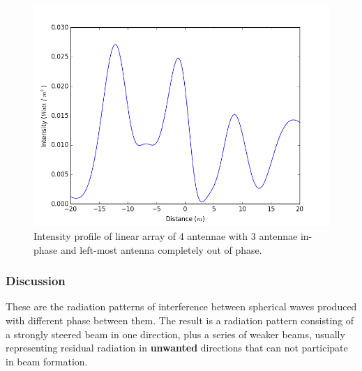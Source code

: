 \begin{figure}[!h]
	\centering	
	\includegraphics[scale=0.45]{figure_5.png}
    \caption{\label{fig:phase_2} Intensity profile of linear array of 4 antennae with 3 antennae in-phase and left-most antenna completely out of phase.}
\end{figure}

\subsubsection{Discussion}

These are the radiation patterns of interference between spherical waves produced with different phase between them. The result is a radiation pattern consisting of a strongly steered beam in one direction, plus a series of weaker beams, usually representing residual radiation in \textbf{unwanted} directions that can not participate in beam formation.
